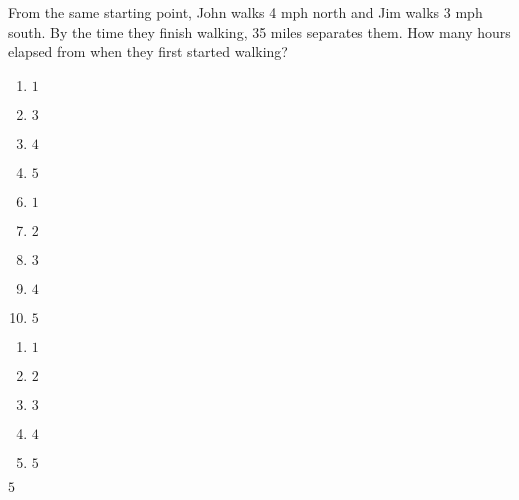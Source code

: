 


 From the same starting point, John walks 4 mph north and Jim walks 3 mph south.  By the time they finish walking, 35 miles separates them.  How many hours elapsed from when they first started walking? 


\ifsat
	\begin{enumerate}[label=\Alph*)]
		\item   $1$
		\item  $3$
		\item  $4$
		\item  $5$ %
	\end{enumerate}
\else
\fi

\ifacteven
	\begin{enumerate}[label=\textbf{\Alph*.},itemsep=\fill,align=left]
		\setcounter{enumii}{5}
		\item   $1$
		\item  $2$
		\item  $3$
		\addtocounter{enumii}{1}
		\item  $4$
		\item  $5$ %
	\end{enumerate}
\else
\fi

\ifactodd
	\begin{enumerate}[label=\textbf{\Alph*.},itemsep=\fill,align=left]
		\item   $1$
		\item  $2$
		\item  $3$
		\item  $4$
		\item  $5$ %
	\end{enumerate}
\else
\fi

\ifgridin
  $5$ %

\else
\fi

